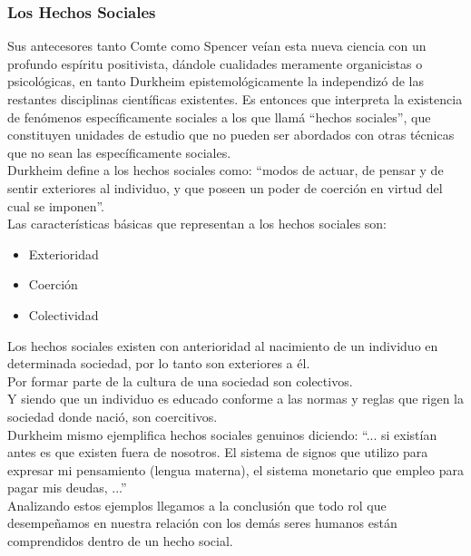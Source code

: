 
\subsubsection{Los Hechos Sociales}
Sus antecesores tanto Comte como Spencer ve\'ian esta nueva ciencia con un profundo esp\'iritu positivista, d\'andole cualidades meramente organicistas o psicol\'ogicas, en tanto Durkheim epistemol\'ogicamente la independiz\'o de las restantes disciplinas cient\'ificas existentes.
 Es entonces que interpreta la existencia de fen\'omenos espec\'ificamente sociales a los que llam\'a ``hechos sociales'', que constituyen unidades de estudio que no pueden ser abordados con otras t\'ecnicas que no sean las espec\'ificamente sociales.\\
Durkheim define a los hechos sociales como: ``modos de actuar, de pensar y de sentir exteriores al individuo, y que poseen un poder de coerci\'on en virtud del cual se imponen''.\\

Las caracter\'isticas b\'asicas que representan a los hechos sociales son:
\begin{itemize}
	\item Exterioridad
	\item Coerci\'on
	\item Colectividad
\end{itemize}

Los hechos sociales existen con anterioridad al nacimiento de un individuo en determinada sociedad, por lo tanto son exteriores a \'el.\\
Por formar parte de la cultura de una sociedad son colectivos.\\
Y siendo que un individuo es educado conforme a las normas y reglas que rigen la sociedad donde naci\'o, son coercitivos.\\
Durkheim mismo ejemplifica hechos sociales genuinos diciendo: ``... si exist\'ian antes es que existen fuera de nosotros. El sistema de signos que utilizo para expresar mi pensamiento (lengua materna), el sistema monetario que empleo para pagar mis deudas, ...''\\
Analizando estos ejemplos llegamos a la conclusi\'on que todo rol que desempe\~namos en nuestra relaci\'on con los dem\'as seres humanos est\'an comprendidos dentro de un hecho social.\\

